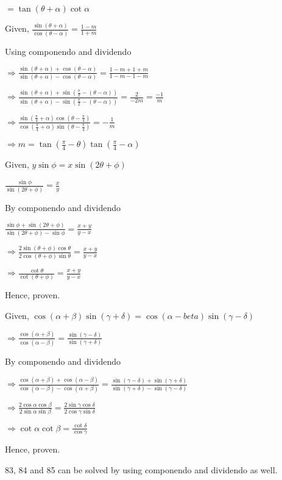   $= \tan(\theta + \alpha)\cot\alpha$

\item Given, $\frac{\sin(\theta + \alpha)}{\cos(\theta - \alpha)} = \frac{1 - m}{1 + m}$

  Using componendo and dividendo

  $\Rightarrow \frac{\sin(\theta + \alpha) + \cos(\theta - \alpha)}{\sin(\theta + \alpha) - \cos(\theta - \alpha)}
  = \frac{1 - m + 1 + m}{1 - m - 1 - m}$

  $\Rightarrow \frac{\sin(\theta + \alpha) + \sin\left(\frac{\pi}{2} - (\theta - \alpha)\right)}{\sin(\theta + \alpha) -
    \sin\left(\frac{\pi}{2} - (\theta - \alpha)\right)} = \frac{2}{-2m} = \frac{-1}{m}$

  $\Rightarrow \frac{\sin\left(\frac{\pi}{4} + \alpha\right)\cos\left(\theta -
    \frac{\pi}{4}\right)}{\cos\left(\frac{\pi}{4} + \alpha\right)\sin\left(\theta - \frac{\pi}{4}\right)} = -\frac{1}{m}$

  $\Rightarrow m = \tan\left(\frac{\pi}{4} - \theta\right)\tan\left(\frac{\pi}{4} - \alpha\right)$

\item Given, $y\sin\phi = x\sin(2\theta + \phi)$

  $\frac{\sin\phi}{\sin(2\theta + \phi)} = \frac{x}{y}$

  By componendo and dividendo

  $\frac{\sin\phi + \sin(2\theta + \phi)}{\sin(2\theta + \phi) - \sin\phi} = \frac{x + y}{y - x}$

  $\Rightarrow \frac{2\sin(\theta + \phi)\cos\theta}{2\cos(\theta + \phi)\sin\theta} = \frac{x + y}{y - x}$

  $\Rightarrow \frac{\cot\theta}{\cot(\theta + \phi)} = \frac{x + y}{y - x}$

  Hence, proven.

\item Given, $\cos(\alpha + \beta)\sin(\gamma + \delta) = \cos(\alpha - beta)\sin(\gamma - \delta)$

  $\Rightarrow \frac{\cos(\alpha + \beta)}{\cos(\alpha - \beta)} = \frac{\sin(\gamma - \delta)}{\sin(\gamma + \delta)}$

  By componendo and dividendo

  $\Rightarrow \frac{\cos(\alpha + \beta) + \cos(\alpha - \beta)}{\cos(\alpha - \beta) - \cos(\alpha + \beta)} =
  \frac{\sin(\gamma - \delta) + \sin(\gamma + \delta)}{\sin(\gamma + \delta) - \sin(\gamma - \delta)}$


  $\Rightarrow \frac{2\cos\alpha\cos\beta}{2\sin\alpha\sin\beta} = \frac{2\sin\gamma\cos\delta}{2\cos\gamma\sin\delta}$

  $\Rightarrow \cot\alpha\cot\beta = \frac{\cot\delta}{\cos\gamma}$

  Hence, proven.

  83, 84 and 85 can be solved by using componendo and dividendo as well.
\stopitemize
